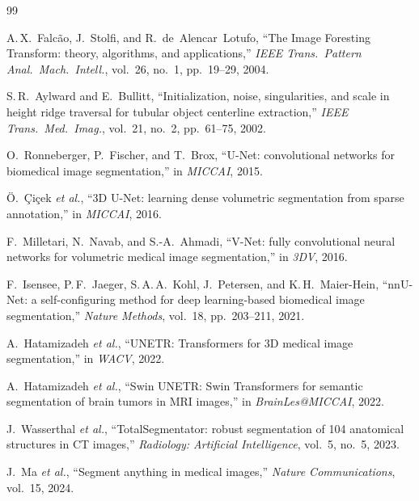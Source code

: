 \documentclass[a4paper,11pt,twoside]{article}
\begin{document}
\begin{thebibliography}{99}

A.\,X.~Falc\~ao, J.~Stolfi, and R.~de~Alencar~Lotufo,
``The Image Foresting Transform: theory, algorithms, and applications,''
\textit{IEEE Trans.\ Pattern Anal.\ Mach.\ Intell.}, vol.~26, no.~1,
pp.~19--29, 2004.

S.\,R.~Aylward and E.~Bullitt,
``Initialization, noise, singularities, and scale in height ridge traversal
for tubular object centerline extraction,''
\textit{IEEE Trans.\ Med.\ Imag.}, vol.~21, no.~2, pp.~61--75, 2002.

O.~Ronneberger, P.~Fischer, and T.~Brox,
``U-Net: convolutional networks for biomedical image segmentation,''
in \textit{MICCAI}, 2015.

\"O.~\c{C}i\c{c}ek \textit{et al.},
``3D U-Net: learning dense volumetric segmentation from sparse annotation,''
in \textit{MICCAI}, 2016.

F.~Milletari, N.~Navab, and S.-A.~Ahmadi,
``V-Net: fully convolutional neural networks for volumetric medical image
segmentation,'' in \textit{3DV}, 2016.

F.~Isensee, P.\,F.~Jaeger, S.\,A.\,A.~Kohl, J.~Petersen, and K.\,H.~Maier-Hein,
``nnU-Net: a self-configuring method for deep learning-based biomedical image
segmentation,'' \textit{Nature Methods}, vol.~18, pp.~203--211, 2021.

A.~Hatamizadeh \textit{et al.}, ``UNETR: Transformers for 3D medical image
segmentation,'' in \textit{WACV}, 2022.

A.~Hatamizadeh \textit{et al.}, ``Swin UNETR: Swin Transformers for semantic
segmentation of brain tumors in MRI images,'' in \textit{BrainLes@MICCAI},
2022.

J.~Wasserthal \textit{et al.}, ``TotalSegmentator: robust segmentation of 104
anatomical structures in CT images,''
\textit{Radiology: Artificial Intelligence}, vol.~5, no.~5, 2023.

J.~Ma \textit{et al.}, ``Segment anything in medical images,''
\textit{Nature Communications}, vol.~15, 2024.


\end{thebibliography}
\end{document}
